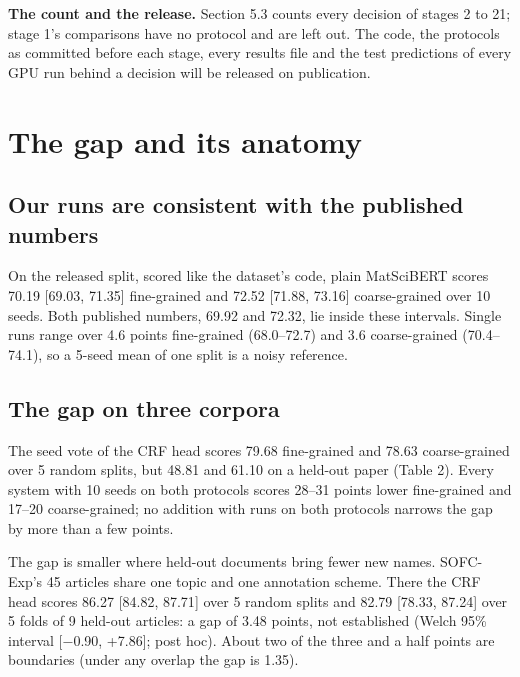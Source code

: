 \documentclass[11pt,a4paper]{article}
\begin{document}
\textbf{The count and the release.} Section 5.3 counts every decision of stages
2 to 21; stage 1's comparisons have no protocol and are left out. The
code, the protocols as committed before each stage, every results file and
the test predictions of every GPU run behind a decision will be released
on publication.

\hypertarget{the-gap-and-its-anatomy}{%
\section{The gap and its anatomy}\label{the-gap-and-its-anatomy}}

\hypertarget{our-runs-are-consistent-with-the-published-numbers}{%
\subsection{Our runs are consistent with the published numbers}\label{our-runs-are-consistent-with-the-published-numbers}}

On the released split, scored like the dataset's code, plain MatSciBERT
scores 70.19 {[}69.03, 71.35{]} fine-grained and 72.52 {[}71.88, 73.16{]}
coarse-grained over 10 seeds. Both published numbers, 69.92 and 72.32, lie
inside these intervals. Single runs range over 4.6 points fine-grained
(68.0--72.7) and 3.6 coarse-grained (70.4--74.1), so a 5-seed mean of one
split is a noisy reference.

\hypertarget{the-gap-on-three-corpora}{%
\subsection{The gap on three corpora}\label{the-gap-on-three-corpora}}

The seed vote of the CRF head scores 79.68 fine-grained and 78.63
coarse-grained over 5 random splits, but 48.81 and 61.10 on a held-out
paper (Table 2). Every system with 10 seeds on both protocols scores 28--31
points lower fine-grained and 17--20 coarse-grained; no addition with runs
on both protocols narrows the gap by more than a few points.

The gap is smaller where held-out documents bring fewer new names. SOFC-Exp's 45 articles
share one topic and one annotation scheme. There the CRF head scores 86.27
{[}84.82, 87.71{]} over 5 random splits and 82.79 {[}78.33, 87.24{]} over 5 folds
of 9 held-out articles: a gap of 3.48 points, not established (Welch 95\%
interval {[}−0.90, +7.86{]}; post hoc). About two of the three and a half
points are boundaries (under any overlap the gap is 1.35).
\end{document}
